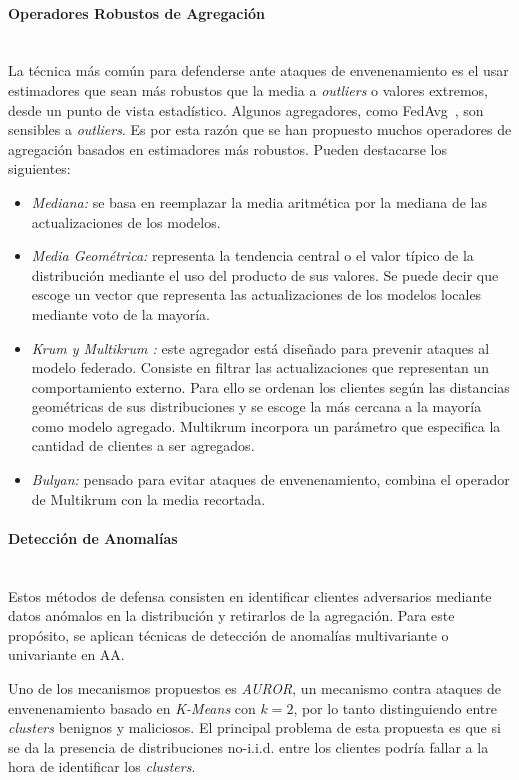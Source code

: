 \paragraph{Operadores Robustos de Agregación}\mbox{}\\
La técnica más común para defenderse ante ataques de envenenamiento es el usar estimadores que sean más robustos que la media a \textit{outliers} o valores extremos, desde un punto de vista estadístico. Algunos agregadores, como \ac{FedAvg}~\cite{mcmahan-2023}, son sensibles a \textit{outliers}. Es por esta razón que se han propuesto muchos operadores de agregación basados en estimadores más robustos. Pueden destacarse los siguientes:
\begin{itemize}
    \item \textit{Mediana:} se basa en reemplazar la media aritmética por la mediana de las actualizaciones de los modelos.
    \item \textit{Media Geométrica:} representa la tendencia central o el valor típico de la distribución mediante el uso del producto de sus valores. Se puede decir que escoge un vector que representa las actualizaciones de los modelos locales mediante voto de la mayoría.
    \item \textit{Krum y Multikrum \cite{krum-2017}:} este agregador está diseñado para prevenir ataques al modelo federado. Consiste en filtrar las actualizaciones que representan un comportamiento externo. Para ello se ordenan los clientes según las distancias geométricas de sus distribuciones y se escoge la más cercana a la mayoría como modelo agregado. Multikrum incorpora un parámetro que especifica la cantidad de clientes a ser agregados.
    \item \textit{Bulyan:} pensado para evitar ataques de envenenamiento, combina el operador de Multikrum con la media recortada.
\end{itemize}

\paragraph{Detección de Anomalías}\mbox{}\\
Estos métodos de defensa consisten en identificar clientes adversarios mediante datos anómalos en la distribución y retirarlos de la agregación. Para este propósito, se aplican técnicas de detección de anomalías multivariante o univariante en \ac{AA}.

Uno de los mecanismos propuestos es \textit{AUROR}, un mecanismo contra ataques de envenenamiento basado en \textit{K-Means} con $k=2$, por lo tanto distinguiendo entre \textit{clusters} benignos y maliciosos. El principal problema de esta propuesta es que si se da la presencia de distribuciones no-\ac{i.i.d.} entre los clientes podría fallar a la hora de identificar los \textit{clusters}.

